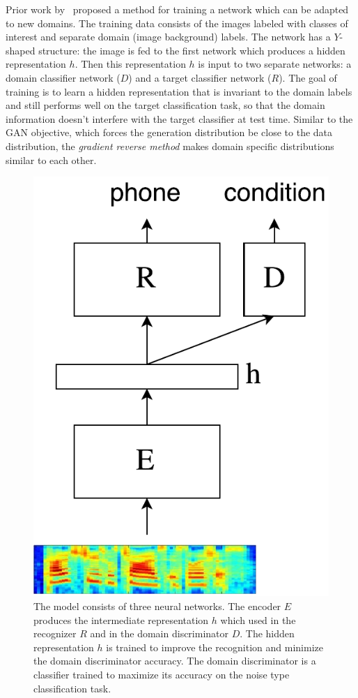 \documentclass[a4paper]{article}
\begin{document}
    Prior work by~\cite{ganin2014unsupervised} proposed a method for training a network 
    which can be adapted to new domains. The training data consists of the images
    labeled with classes of interest and separate domain (image background) labels. 
    The network has a $Y$-shaped structure: the image is fed to the
    first network which produces a hidden representation $h$. Then this 
    representation $h$ is input to two separate networks: a domain classifier network ($D$) and 
    a target classifier network ($R$). The goal of training is to learn a hidden 
    representation that is invariant to the domain labels and still performs well on 
    the target classification task, so that the domain information doesn't 
    interfere with the target classifier at test time. Similar to the GAN 
    objective, which forces the generation distribution be close to the data distribution,
    the \emph{gradient reverse method} makes domain specific distributions similar to each other.
\begin{figure}[t]
    \centering

    \centering
        \includegraphics[width=0.4\linewidth]{model.pdf}
        \caption{The model consists of three neural networks. The encoder $E$ produces
        the intermediate representation $h$ which used in the recognizer $R$ and 
        in the domain discriminator $D$. The hidden representation $h$ is trained to improve
        the recognition and minimize the domain discriminator accuracy. The domain discriminator
        is a classifier trained to maximize its accuracy on the noise type
        classification task.}
        \label{fig:model}
\end{figure}
\end{document}
